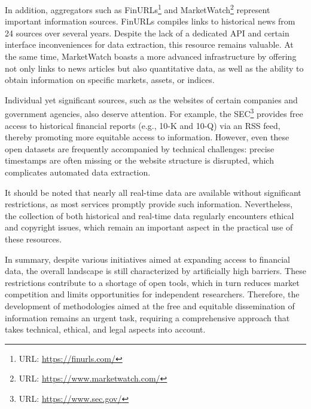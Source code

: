 In addition, aggregators such as FinURLs\footnote{URL: \url{https://finurls.com/}} and MarketWatch\footnote{URL: \url{https://www.marketwatch.com/}}
represent important information sources. FinURLs compiles links to historical news from 24 sources over several years. Despite the lack
of a dedicated API and certain interface inconveniences for data extraction, this resource remains valuable. At the same time,
MarketWatch boasts a more advanced infrastructure by offering not only links to news articles but also quantitative data, as well as the ability
to obtain information on specific markets, assets, or indices.

Individual yet significant sources, such as the websites of certain companies and government agencies, also deserve attention. For example,
the SEC\footnote{URL: \url{https://www.sec.gov/}} provides free access to historical financial reports (e.g., 10-K and 10-Q) via an RSS feed,
thereby promoting more equitable access to information. However, even these open datasets are frequently accompanied by technical challenges:
precise timestamps are often missing or the website structure is disrupted, which complicates automated data extraction.

It should be noted that nearly all real-time data are available without significant restrictions, as most services promptly provide such information.
Nevertheless, the collection of both historical and real-time data regularly encounters ethical and copyright issues, which remain an important aspect
in the practical use of these resources.

In summary, despite various initiatives aimed at expanding access to financial data, the overall landscape is still characterized by artificially
high barriers. These restrictions contribute to a shortage of open tools, which in turn reduces market competition and limits opportunities
for independent researchers. Therefore, the development of methodologies aimed at the free and equitable dissemination of information remains
an urgent task, requiring a comprehensive approach that takes technical, ethical, and legal aspects into account.